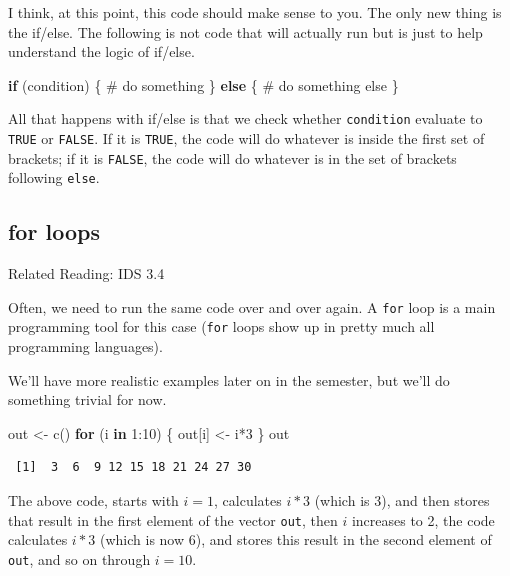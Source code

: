 \documentclass[
  letterpaper,
  DIV=11,
  numbers=noendperiod]{scrreprt}
\newenvironment{Shaded}{\begin{snugshade}}{\end{snugshade}}
\newcommand{\CommentTok}[1]{\textcolor[rgb]{0.37,0.37,0.37}{#1}}
\newcommand{\ControlFlowTok}[1]{\textcolor[rgb]{0.00,0.23,0.31}{\textbf{#1}}}
\newcommand{\DecValTok}[1]{\textcolor[rgb]{0.68,0.00,0.00}{#1}}
\newcommand{\FunctionTok}[1]{\textcolor[rgb]{0.28,0.35,0.67}{#1}}
\newcommand{\NormalTok}[1]{\textcolor[rgb]{0.00,0.23,0.31}{#1}}
\newcommand{\OtherTok}[1]{\textcolor[rgb]{0.00,0.23,0.31}{#1}}
\newcommand{\SpecialCharTok}[1]{\textcolor[rgb]{0.37,0.37,0.37}{#1}}
\begin{document}
I think, at this point, this code should make sense to you. The only new
thing is the if/else. The following is not code that will actually run
but is just to help understand the logic of if/else.

\begin{Shaded}
\begin{Highlighting}[]
\ControlFlowTok{if}\NormalTok{ (condition) \{}
  \CommentTok{\# do something}
\NormalTok{\} }\ControlFlowTok{else}\NormalTok{ \{}
  \CommentTok{\# do something else}
\NormalTok{\}}
\end{Highlighting}
\end{Shaded}

All that happens with if/else is that we check whether
\texttt{condition} evaluate to \texttt{TRUE} or \texttt{FALSE}. If it is
\texttt{TRUE}, the code will do whatever is inside the first set of
brackets; if it is \texttt{FALSE}, the code will do whatever is in the
set of brackets following \texttt{else}.

\subsection{for loops}\label{for-loops}

Related Reading: IDS 3.4

Often, we need to run the same code over and over again. A \texttt{for}
loop is a main programming tool for this case (\texttt{for} loops show
up in pretty much all programming languages).

We'll have more realistic examples later on in the semester, but we'll
do something trivial for now.

\begin{Shaded}
\begin{Highlighting}[]
\NormalTok{out }\OtherTok{\textless{}{-}} \FunctionTok{c}\NormalTok{()}
\ControlFlowTok{for}\NormalTok{ (i }\ControlFlowTok{in} \DecValTok{1}\SpecialCharTok{:}\DecValTok{10}\NormalTok{) \{}
\NormalTok{  out[i] }\OtherTok{\textless{}{-}}\NormalTok{ i}\SpecialCharTok{*}\DecValTok{3}
\NormalTok{\}}
\NormalTok{out}
\end{Highlighting}
\end{Shaded}

\begin{verbatim}
 [1]  3  6  9 12 15 18 21 24 27 30
\end{verbatim}

The above code, starts with \(i=1\), calculates \(i*3\) (which is 3),
and then stores that result in the first element of the vector
\texttt{out}, then \(i\) increases to 2, the code calculates \(i*3\)
(which is now 6), and stores this result in the second element of
\texttt{out}, and so on through \(i=10\).
\end{document}

